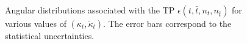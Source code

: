 \documentclass[aps,preprint,tightenlines,floatfix,superscriptaddress,nofootinbib,showpacs]{revtex4-1}
\def\tbar{\bar{t}}
\def\kp{\kappa_t}
\def\kpt{\tilde{\kappa}_t}
\begin{document}
\begin{center}
\begin{figure}[H]
\hspace*{-0.45cm}
\hspace*{-0.006\textwidth}
\caption{Angular distributions associated with the TP
  $\epsilon(t,\tbar,n_t,n_{\tbar})$ for various values of
  $(\kp,\kpt)$. The error bars correspond to the statistical
  uncertainties.}
\label{fig5}
\end{figure}
\end{center}
\end{document}
